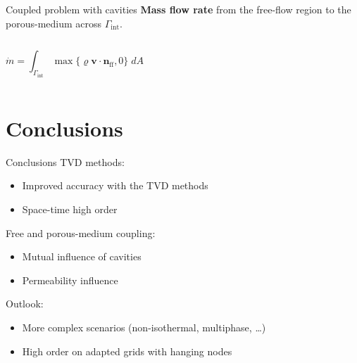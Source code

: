 \documentclass{beamer}
\begin{document}
%	
\begin{frame}{Coupled problem with cavities}
\textbf{Mass flow rate} from the free-flow region to the porous-medium across $\Gamma_\text{int}$.
\begin{columns}
	\begin{equation*}
	\dot{m} = \int_{\Gamma_\text{int}} \max \{ \varrho \mathbf{v} \cdot 
	\mathbf{n}_\text{ff} , 0 \} \; dA
	\end{equation*}
	\begin{figure}
		\centering
		
	\end{figure}
\end{columns}
\end{frame}
\section{Conclusions}
\begin{frame}{Conclusions}
TVD methods:
\begin{itemize}
	\item Improved accuracy with the TVD methods
	\item Space-time high order
\end{itemize}
Free and porous-medium coupling:
\begin{itemize}
	\item Mutual influence of cavities
	\item Permeability influence
\end{itemize}
Outlook:
\begin{itemize}
	\item More complex scenarios (non-isothermal, multiphase, \dots)
	\item High order on adapted grids with hanging nodes
\end{itemize}
\end{frame}
\end{document}
